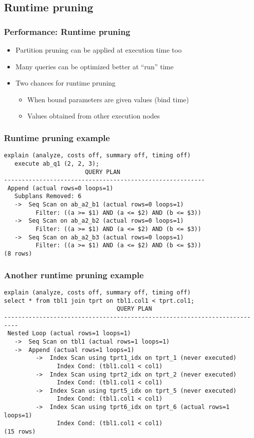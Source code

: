 \subsection{Runtime pruning}
\begin{frame}
  \frametitle{Performance: Runtime pruning}

  \begin{itemize}
    \item Partition pruning can be applied at execution time too
    \item Many queries can be optimized better at ``run'' time
    \item Two chances for runtime pruning
      \begin{itemize}
	\item When bound parameters are given values (bind time)
	\item Values obtained from other execution nodes
      \end{itemize}
  \end{itemize}
\end{frame}

\begin{frame}[fragile]
  \frametitle{Runtime pruning example}
\footnotesize
\begin{lstlisting}
explain (analyze, costs off, summary off, timing off)
   execute ab_q1 (2, 2, 3);
                       QUERY PLAN                        
---------------------------------------------------------
 Append (actual rows=0 loops=1)
   Subplans Removed: 6
   ->  Seq Scan on ab_a2_b1 (actual rows=0 loops=1)
         Filter: ((a >= $1) AND (a <= $2) AND (b <= $3))
   ->  Seq Scan on ab_a2_b2 (actual rows=0 loops=1)
         Filter: ((a >= $1) AND (a <= $2) AND (b <= $3))
   ->  Seq Scan on ab_a2_b3 (actual rows=0 loops=1)
         Filter: ((a >= $1) AND (a <= $2) AND (b <= $3))
(8 rows)
\end{lstlisting}
\end{frame}

\begin{frame}[fragile]
  \frametitle{Another runtime pruning example}
\footnotesize
\begin{lstlisting}
explain (analyze, costs off, summary off, timing off)
select * from tbl1 join tprt on tbl1.col1 < tprt.col1;
                                QUERY PLAN                                
--------------------------------------------------------------------------
 Nested Loop (actual rows=1 loops=1)
   ->  Seq Scan on tbl1 (actual rows=1 loops=1)
   ->  Append (actual rows=1 loops=1)
         ->  Index Scan using tprt1_idx on tprt_1 (never executed)
               Index Cond: (tbl1.col1 < col1)
         ->  Index Scan using tprt2_idx on tprt_2 (never executed)
               Index Cond: (tbl1.col1 < col1)
         ->  Index Scan using tprt5_idx on tprt_5 (never executed)
               Index Cond: (tbl1.col1 < col1)
         ->  Index Scan using tprt6_idx on tprt_6 (actual rows=1 loops=1)
               Index Cond: (tbl1.col1 < col1)
(15 rows)
\end{lstlisting}

\end{frame}

